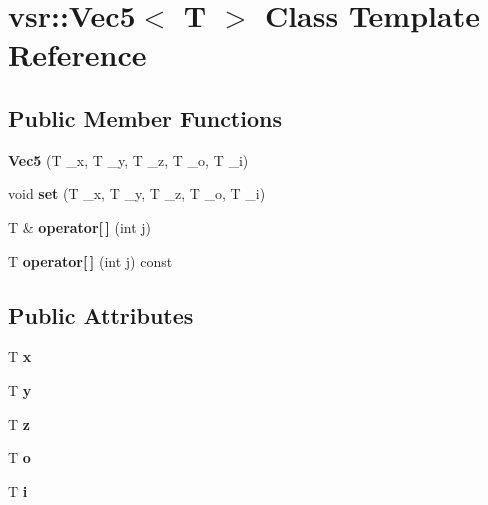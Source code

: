 \hypertarget{classvsr_1_1_vec5}{\section{vsr\-:\-:Vec5$<$ T $>$ Class Template Reference}
\label{classvsr_1_1_vec5}
}
\subsection*{Public Member Functions}
\begin{DoxyCompactItemize}
\item 
\hypertarget{classvsr_1_1_vec5_a30229e87a89d0119bdd722a77cf9fd4b}{{\bfseries Vec5} (T \-\_\-x, T \-\_\-y, T \-\_\-z, T \-\_\-o, T \-\_\-i)}\label{classvsr_1_1_vec5_a30229e87a89d0119bdd722a77cf9fd4b}

\item 
\hypertarget{classvsr_1_1_vec5_aa7a2d6c5a97520f96eee628b48e120eb}{void {\bfseries set} (T \-\_\-x, T \-\_\-y, T \-\_\-z, T \-\_\-o, T \-\_\-i)}\label{classvsr_1_1_vec5_aa7a2d6c5a97520f96eee628b48e120eb}

\item 
\hypertarget{classvsr_1_1_vec5_a757debe63cca11970b3a0f1c04d9df2e}{T \& {\bfseries operator\mbox{[}$\,$\mbox{]}} (int j)}\label{classvsr_1_1_vec5_a757debe63cca11970b3a0f1c04d9df2e}

\item 
\hypertarget{classvsr_1_1_vec5_a03bf9d72918c6d9ac38de77164374e54}{T {\bfseries operator\mbox{[}$\,$\mbox{]}} (int j) const }\label{classvsr_1_1_vec5_a03bf9d72918c6d9ac38de77164374e54}

\end{DoxyCompactItemize}
\subsection*{Public Attributes}
\begin{DoxyCompactItemize}
\item 
\hypertarget{classvsr_1_1_vec5_ae302030c02ee84b48db92fd68ea780bb}{T {\bfseries x}}\label{classvsr_1_1_vec5_ae302030c02ee84b48db92fd68ea780bb}

\item 
\hypertarget{classvsr_1_1_vec5_a2c012bd1501f966d104c652af080df00}{T {\bfseries y}}\label{classvsr_1_1_vec5_a2c012bd1501f966d104c652af080df00}

\item 
\hypertarget{classvsr_1_1_vec5_ac90794b0d14cc23a6113a11b896ffbb2}{T {\bfseries z}}\label{classvsr_1_1_vec5_ac90794b0d14cc23a6113a11b896ffbb2}

\item 
\hypertarget{classvsr_1_1_vec5_a76f36c82a2dbe75b49e53fec6236dbcf}{T {\bfseries o}}\label{classvsr_1_1_vec5_a76f36c82a2dbe75b49e53fec6236dbcf}

\item 
\hypertarget{classvsr_1_1_vec5_a4ffb566b8a21f8a0eb69385406c7197a}{T {\bfseries i}}\label{classvsr_1_1_vec5_a4ffb566b8a21f8a0eb69385406c7197a}

\end{DoxyCompactItemize}
